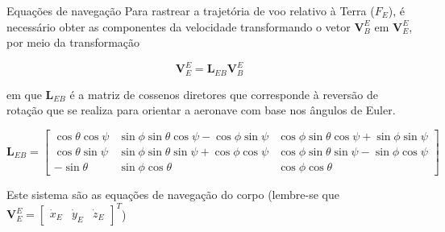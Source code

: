 \documentclass{beamer}
\newcommand{\jindent}{\justifying\setlength{\parindent}{1.5em}}
\begin{document}
\begin{frame}{Equações de navegação}
    \jindent
    Para rastrear a trajetória de voo relativo à Terra ($F_E$), é necessário obter as componentes da velocidade transformando o vetor $\mathbf{V}_B^E$ em $\mathbf{V}_E^E$, por meio da transformação

    \begin{equation*}
        \mathbf{V}_E^E = \mathbf L_{EB}\mathbf{V}_B^E
    \end{equation*}

    \justifying
    em que $\mathbf L_{EB}$ é a matriz de cossenos diretores que corresponde à reversão de rotação que se realiza para orientar a aeronave com base nos ângulos de Euler.

    \begin{equation*}
    \mathbf L_{EB} =
        \begin{bmatrix}
        \cos\theta \cos\psi &
        \sin\phi \sin\theta \cos\psi - \cos\phi \sin\psi &
        \cos\phi \sin\theta \cos\psi + \sin\phi \sin\psi \\
        
        \cos\theta \sin\psi &
        \sin\phi \sin\theta \sin\psi + \cos\phi \cos\psi &
        \cos\phi \sin\theta \sin\psi - \sin\phi \cos\psi \\
        
        -\sin\theta &
        \sin\phi \cos\theta &
        \cos\phi \cos\theta
        \end{bmatrix}
    \end{equation*}

    \jindent
    Este sistema são as equações de navegação do corpo (lembre-se que  $\mathbf{V}_E^E = \begin{bmatrix} \dot x_E & \dot y_E &\dot z_E \end{bmatrix}^T$)

    
\end{frame}

\end{document}
